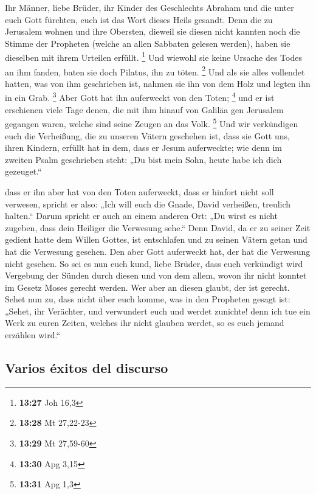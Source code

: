  Ihr Männer, liebe Brüder, ihr Kinder des Geschlechts
Abraham und die unter euch Gott fürchten, euch ist das Wort dieses Heils
gesandt.  Denn die zu Jerusalem wohnen und ihre Obersten,
dieweil sie diesen nicht kannten noch die Stimme der Propheten (welche
an allen Sabbaten gelesen werden), haben sie dieselben mit ihrem
Urteilen erfüllt. \footnote{\textbf{13:27} Joh 16,3}  Und
wiewohl sie keine Ursache des Todes an ihm fanden, baten sie doch
Pilatus, ihn zu töten. \footnote{\textbf{13:28} Mt 27,22-23}
 Und als sie alles vollendet hatten, was von ihm
geschrieben ist, nahmen sie ihn von dem Holz und legten ihn in ein Grab.
\footnote{\textbf{13:29} Mt 27,59-60}  Aber Gott hat ihn
auferweckt von den Toten; \footnote{\textbf{13:30} Apg 3,15}
 und er ist erschienen viele Tage denen, die mit ihm
hinauf von Galiläa gen Jerusalem gegangen waren, welche sind seine
Zeugen an das Volk. \footnote{\textbf{13:31} Apg 1,3} 
Und wir verkündigen euch die Verheißung, die zu unseren Vätern geschehen
ist,  dass sie Gott uns, ihren Kindern, erfüllt hat in
dem, dass er Jesum auferweckte; wie denn im zweiten Psalm geschrieben
steht: „Du bist mein Sohn, heute habe ich dich gezeuget.``

 dass er ihn aber hat von den Toten auferweckt, dass er
hinfort nicht soll verwesen, spricht er also: „Ich will euch die Gnade,
David verheißen, treulich halten.``  Darum spricht er
auch an einem anderen Ort: „Du wirst es nicht zugeben, dass dein
Heiliger die Verwesung sehe.``  Denn David, da er zu
seiner Zeit gedient hatte dem Willen Gottes, ist entschlafen und zu
seinen Vätern getan und hat die Verwesung gesehen.  Den
aber Gott auferweckt hat, der hat die Verwesung nicht gesehen.
 So sei es nun euch kund, liebe Brüder, dass euch
verkündigt wird Vergebung der Sünden durch diesen und von dem allem,
wovon ihr nicht konntet im Gesetz Moses gerecht werden. 
Wer aber an diesen glaubt, der ist gerecht.  Sehet nun
zu, dass nicht über euch komme, was in den Propheten gesagt ist:
 „Sehet, ihr Verächter, und verwundert euch und werdet
zunichte! denn ich tue ein Werk zu euren Zeiten, welches ihr nicht
glauben werdet, so es euch jemand erzählen wird.``

\hypertarget{varios-uxe9xitos-del-discurso}{%
\subsection{Varios éxitos del
discurso}\label{varios-uxe9xitos-del-discurso}}

